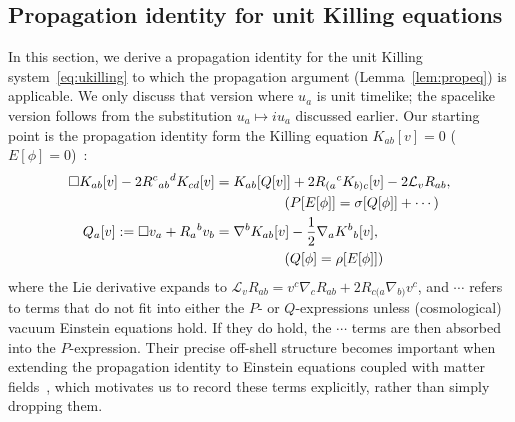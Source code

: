 \documentclass[a4paper]{article}
\theoremstyle{remark}
\begin{document}
\subsection{Propagation identity for unit Killing equations} \label{sec:ukilling-propeq}

In this section, we derive a propagation identity for the unit Killing
system~\eqref{eq:ukilling} to which the propagation argument
(Lemma~\ref{lem:propeq}) is applicable. We only discuss that version
where $u_a$ is unit timelike; the spacelike version follows from the
substitution $u_a \mapsto i u_a$ discussed earlier.
Our starting point is the propagation identity form the Killing equation
$K_{ab}[v] = 0$ ($E[\phi] = 0$)~\cite[Sec.2.1]{khgp-ckid}:
\begin{align}
\label{eq:k-propeq}
	\square K_{ab}[v] - 2R^c{}_{ab}{}^d K_{cd}[v]
		&= K_{ab}[Q [v]] + 2 R_{(a}{}^c K_{b)c}[v] - 2 \mathcal{L}_v R_{ab} , \\
		& {}\hspace{5em} (P[E[\phi]] = \sigma[Q[\phi]] + \cdots) \notag
	\\
\label{eq:k-propeq-conv}
	Q_a [v] := \square v_a + R_a{}^b v_b
		&= \nabla^b K_{ab}[v] - \frac{1}{2} \nabla_a K^b{}_b[v] , \\
		& {}\hspace{5em} (Q[\phi] = \rho[E[\phi]]) \notag
\end{align}
where the Lie derivative expands to $\mathcal{L}_v R_{ab} = v^c \nabla_c
R_{ab} + 2 R_{c(a} \nabla_{b)} v^c$, and $\cdots$ refers to terms that
do not fit into either the $P$- or $Q$-expressions unless (cosmological)
vacuum Einstein equations hold. If they do hold, the $\cdots$ terms are
then absorbed into the $P$-expression. Their precise off-shell structure
becomes important when extending the propagation identity to Einstein
equations coupled with matter fields~\cite{racz-kid1, racz-kid2}, which
motivates us to record these terms explicitly, rather than simply
dropping them.
\end{document}
